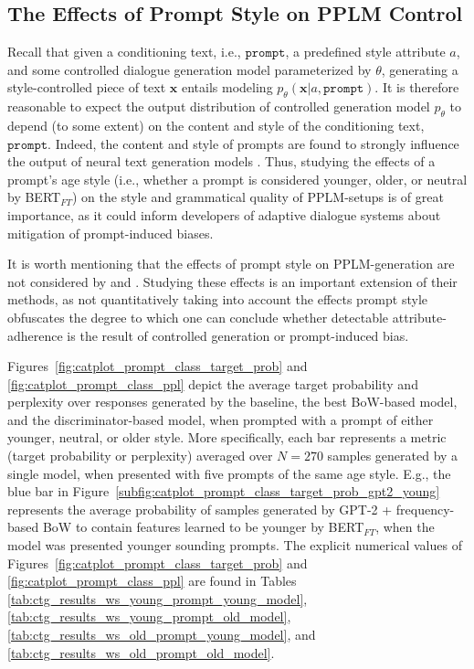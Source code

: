 \subsection{The Effects of Prompt Style on PPLM Control}
\label{subsec:ctg_anal_prompt_class}

Recall that given a conditioning text, i.e., $\texttt{prompt}$, a predefined style attribute $a$, and some controlled dialogue generation model parameterized by $\theta$, generating a style-controlled piece of text $\textbf{x}$ entails modeling $p_{\theta}(\textbf{x} | a, \texttt{prompt})$. It is therefore reasonable to expect the output distribution of controlled generation model $p_{\theta}$ to depend (to some extent) on the content and style of the conditioning text, $\texttt{prompt}$. Indeed, the content and style of prompts are found to strongly influence the output of neural text generation models \citep{fan-etal-2018-hierarchical, lester2021power}. Thus, studying the effects of a prompt's age style (i.e., whether a prompt is considered younger, older, or neutral by BERT$_{FT}$) on the style and grammatical quality of PPLM-setups is of great importance, as it could inform developers of adaptive dialogue systems about mitigation of prompt-induced biases.

It is worth mentioning that the effects of prompt style on PPLM-generation are not considered by \cite{dathathri2019plug} and \cite{madotto-etal-2020-plug}. Studying these effects is an important extension of their methods, as not quantitatively taking into account the effects prompt style obfuscates the degree to which one can conclude whether detectable attribute-adherence is the result of controlled generation or prompt-induced bias.

Figures~\ref{fig:catplot_prompt_class_target_prob} and \ref{fig:catplot_prompt_class_ppl} depict the average target probability and perplexity over responses generated by the baseline, the best BoW-based model, and the discriminator-based model, when prompted with a prompt of either younger, neutral, or older style. More specifically, each bar represents a metric (target probability or perplexity) averaged over $N=270$ samples generated by a single model, when presented with five prompts of the same age style. E.g., the blue bar in Figure~\ref{subfig:catplot_prompt_class_target_prob_gpt2_young} represents the average probability of samples generated by GPT-2 + frequency-based BoW to contain features learned to be younger by BERT$_{FT}$, when the model was presented younger sounding prompts. The explicit numerical values of Figures~\ref{fig:catplot_prompt_class_target_prob} and \ref{fig:catplot_prompt_class_ppl} are found in Tables \ref{tab:ctg_results_ws_young_prompt_young_model}, \ref{tab:ctg_results_ws_young_prompt_old_model}, \ref{tab:ctg_results_ws_old_prompt_young_model}, and \ref{tab:ctg_results_ws_old_prompt_old_model}.


